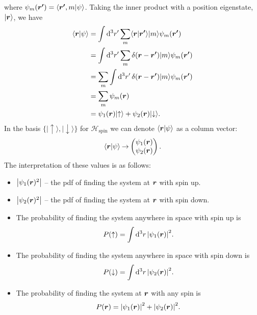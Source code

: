 \documentclass[a4paper]{article}
\renewcommand{\ket}[1]{\vert {#1} \rangle}
\renewcommand{\braket}[2]{\langle {#1} \vert {#2} \rangle}
\newcommand{\hilbert}{\mathcal{H}}
\newcommand{\spinUp}{\uparrow}
\newcommand{\spinDown}{\downarrow}
\newcommand{\representation}{\mathbin{\rightarrow}}
\theoremstyle{definition}
\begin{document}
    where \(\psi_m(\vv{r'}) = \braket{\vv{r'}, m}{\psi}\).
    Taking the inner product with a position eigenstate, \(\ket{\vv{r}}\), we have
    \begin{align*}
        \braket{\vv{r}}{\psi} &= \int \dd[3]{r'}\sum_m \braket{\vv{r}}{\vv{r'}}\ket{m}\psi_m(\vv{r'})\\
        &= \int \dd[3]{r'} \sum_m \delta(\vv{r} - \vv{r'})\ket{m}\psi_m(\vv{r'})\\
        &= \sum_m \int \dd[3]{r'} \delta(\vv{r} - \vv{r'})\ket{m}\psi_m(\vv{r'})\\
        &= \sum_m \psi_m(\vv{r})\\
        &= \psi_1(\vv{r})\ket{\spinUp} + \psi_2(\vv{r})\ket{\spinDown}.
    \end{align*}
    In the basis \(\{\ket{\spinUp}, \ket{\spinDown}\}\) for \(\hilbert_\text{spin}\) we can denote \(\braket{\vv{r}}{\psi}\) as a column vector:
    \[
        \braket{\vv{r}}{\psi} \representation 
        \begin{pmatrix}
            \psi_1(\vv{r})\\ \psi_2(\vv{r})
        \end{pmatrix}
        .
    \]
    The interpretation of these values is as follows:
    \begin{itemize}
        \item \(\abs{\psi_1(\bm{r})^2}\) -- the \gls{pdf} of finding the system at \(\bm{r}\) with spin up.
        \item \(\abs{\psi_2(\bm{r})^2}\) -- the \gls{pdf} of finding the system at \(\bm{r}\) with spin down.
        \item The probability of finding the system anywhere in space with spin up is
        \[P(\spinUp) = \int\dd[3]{r}\abs{\psi_1(\vv{r})}^2.\]
        \item The probability of finding the system anywhere in space with spin down is
        \[P(\spinDown) = \int\dd[3]{r}\abs{\psi_2(\vv{r})}^2.\]
        \item The probability of finding the system at \(\bm{r}\) with any spin is
        \[P(\bm{r}) = \abs{\psi_1(\bm{r})}^2 + \abs{\psi_2(\bm{r})}^2.\] 
    \end{itemize}
    
\end{document}
